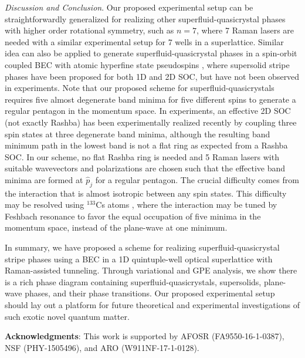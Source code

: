 \documentclass[twocolumn,prl,floatfix,citeautoscript,nofootinbib]{revtex4}
\begin{document}
\emph{Discussion and Conclusion}. Our proposed experimental setup can be
straightforwardly generalized for realizing other superfluid-quasicrystal
phases with higher order rotational symmetry, such as $n=7$, where 7 Raman
lasers are needed with a similar experimental setup for 7 wells in a
superlattice. Similar idea can also be applied to generate
superfluid-quasicrystal phases in a spin-orbit coupled BEC with atomic
hyperfine state pseudospins \cite%
{Lin2011,Zhang2012b,Qu2013a,Olson2014,Hamner2014,Wang2012,Cheuk2012,Williams2013,Lev,Jo,Huang2016, Meng2016,Pan2016}%
, where supersolid stripe phases have been proposed \cite{Stanescu2008,
Wu2011, wang2010spin, ho2011bose, li2012quantum, zhang2012mean, hu2012spin,
ozawa2012stability, sun2016interacting, yu2016phase,
martone2016tricriticalities} for both 1D and 2D SOC, but have not been
observed in experiments. Note that our proposed scheme for
superfluid-quasicrystals requires five almost degenerate band minima for
five different spins to generate a regular pentagon in the momentum space.
In experiments, an effective 2D SOC (not exactly Rashba) has been
experimentally realized recently \cite{Huang2016, Meng2016,Pan2016} by
coupling three spin states at three degenerate band minima, although the
resulting band minimum path in the lowest band is not a flat ring as
expected from a Rashba SOC. In our scheme, no flat Rashba ring is needed and
5 Raman lasers with suitable wavevectors and polarizations are chosen such
that the effective band minima are formed at $\hat{p}_{j}$ for a regular
pentagon. The crucial difficulty comes from the interaction that is almost
isotropic between any spin states. This difficulty may be resolved using $%
^{133}$Cs atoms \cite{Chin2015}, where the interaction may be tuned by
Feshbach resonance to favor the equal occupation of five minima in the
momentum space, instead of the plane-wave at one minimum.

In summary, we have proposed a scheme for realizing superfluid-quasicrystal
stripe phases using a BEC in a 1D quintuple-well optical superlattice with
Raman-assisted tunneling. Through variational and GPE analysis, we show
there is a rich phase diagram containing superfluid-quasicrystals,
supersolids, plane-wave phases, and their phase transitions. Our proposed
experimental setup should lay out a platform for future theoretical and
experimental investigations of such exotic novel quantum matter.

\begin{acknowledgments}
\textbf{Acknowledgments}: This work is supported by AFOSR
(FA9550-16-1-0387), NSF (PHY-1505496), and ARO (W911NF-17-1-0128).
\end{acknowledgments}
\end{document}

